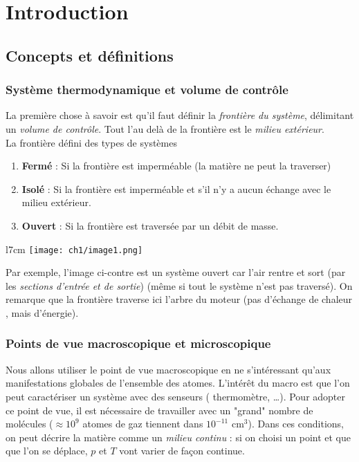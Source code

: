\chapter{Introduction} 

	\setcounter{section}{1}
\section{Concepts et définitions}
	\subsection{Système thermodynamique et volume de contrôle}
	La première chose à savoir est qu'il faut définir la \textit{frontière 
	du système}, délimitant un \textit{volume de contrôle}. Tout l'au delà 
	de la frontière est le \textit{milieu extérieur}.\\
	
	La frontière défini des types de systèmes
	\begin{enumerate}
	\item \textbf{Fermé} : Si la frontière est imperméable (la matière ne 
	peut la traverser)
	\item \textbf{Isolé} : Si la frontière est imperméable et s'il n'y a 
	aucun échange avec le milieu extérieur.
	\item \textbf{Ouvert} : Si la frontière est traversée par un débit de 
	masse.
	\end{enumerate}
	
	\begin{wrapfigure}[6]{l}{7cm}
	\vspace{-6mm}
	\texttt{[image: ch1/image1.png]}
	\end{wrapfigure}
	Par exemple, l'image ci-contre est un système ouvert car l'air 
	rentre et sort (par les \textit{sections d'entrée et de sortie}) (même 
	si tout le système n'est pas traversé). On remarque que la frontière 
	traverse ici l'arbre du moteur (pas d'échange de chaleur , mais 
	d'énergie).
	
	
	\subsection{Points de vue macroscopique et microscopique}
	Nous allons utiliser le point de vue macroscopique en ne s'intéressant  
	qu'aux manifestations globales de l'ensemble des atomes. L'intérêt du 
	macro est que l'on peut caractériser un système avec des senseurs (
	thermomètre, \dots). Pour adopter ce point de vue, il est nécessaire 
	de travailler avec un "grand" nombre de molécules ($\approx 10^9$ atomes 
	de gaz tiennent dans $10^{-11}$ cm$^3$). Dans ces conditions, on peut 
	décrire la matière comme un \textit{milieu continu} : si on choisi un 
	point et que que l'on se déplace, $p$ et $T$ vont varier de façon 
	continue.
	
